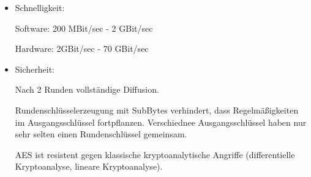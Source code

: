 \begin{itemize}
  \item Schnelligkeit: 

  Software: 200 MBit/sec - 2 GBit/sec

  Hardware: 2GBit/sec - 70 GBit/sec

  \item Sicherheit:

  Nach 2 Runden vollständige Diffusion. 

  Rundenschlüsselerzeugung mit SubBytes verhindert, dass Regelmäßigkeiten im Ausgangsschlüssel fortpflanzen. Verschiednee Ausgangsschlüssel haben nur sehr selten einen Rundenschlüssel gemeinsam.

  AES ist resistent gegen klassische kryptoanalytische Angriffe (differentielle Kryptoanalyse, lineare Kryptoanalyse).

\end{itemize}